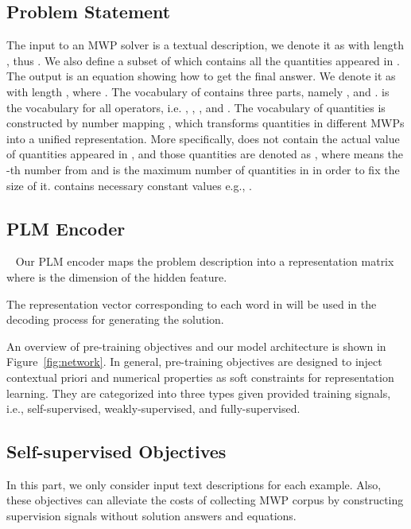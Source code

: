 \documentclass[11pt]{article}
\begin{document}
\subsection{Problem Statement}
The input to an MWP solver is a textual description, we denote it as  with length , thus . We also define a subset  of  which contains all the quantities appeared in . The output is an equation showing how to get the final answer. We denote it as  with length , where . The vocabulary of  contains three parts, namely ,  and .  is the vocabulary for all operators, i.e. , , ,  and . The vocabulary of quantities  is constructed by number mapping \cite{wang2017deep}, which transforms quantities in different MWPs into a unified representation. More specifically,  does not contain the actual value of quantities appeared in , and those quantities are denoted as , where  means the -th number from  and  is the maximum number of quantities in  in order to fix the size of it.  contains necessary constant values e.g.,  .




\subsection{PLM Encoder}~\label{sec:train_obj}
Our PLM encoder maps the problem description  into a representation matrix  where  is the dimension of the hidden feature.



The representation vector corresponding to each word in  will be used in the decoding process for generating the solution. 

An overview of pre-training objectives and our model architecture is shown in Figure~\ref{fig:network}. In general, pre-training objectives are designed to inject contextual priori and numerical properties as soft constraints for representation learning. They are categorized into three types given provided training signals, i.e., self-supervised, weakly-supervised, and fully-supervised.

\subsection{Self-supervised Objectives}

In this part, we only consider input text descriptions for each example. Also, these objectives can alleviate the costs of collecting MWP corpus by constructing supervision signals without solution answers and equations. 
\end{document}
